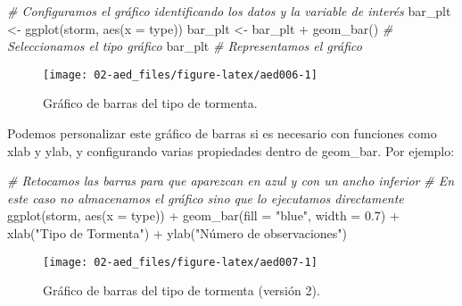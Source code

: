 \documentclass[
]{book}
\newenvironment{Shaded}{\begin{snugshade}}{\end{snugshade}}
\newcommand{\AttributeTok}[1]{\textcolor[rgb]{0.77,0.63,0.00}{#1}}
\newcommand{\CommentTok}[1]{\textcolor[rgb]{0.56,0.35,0.01}{\textit{#1}}}
\newcommand{\FloatTok}[1]{\textcolor[rgb]{0.00,0.00,0.81}{#1}}
\newcommand{\FunctionTok}[1]{\textcolor[rgb]{0.00,0.00,0.00}{#1}}
\newcommand{\NormalTok}[1]{#1}
\newcommand{\OtherTok}[1]{\textcolor[rgb]{0.56,0.35,0.01}{#1}}
\newcommand{\SpecialCharTok}[1]{\textcolor[rgb]{0.00,0.00,0.00}{#1}}
\newcommand{\StringTok}[1]{\textcolor[rgb]{0.31,0.60,0.02}{#1}}
\begin{document}
\begin{Shaded}
\begin{Highlighting}[]
\CommentTok{\# Configuramos el gráfico identificando los datos y la variable de interés}
\NormalTok{bar\_plt }\OtherTok{\textless{}{-}} \FunctionTok{ggplot}\NormalTok{(storm, }\FunctionTok{aes}\NormalTok{(}\AttributeTok{x =}\NormalTok{ type)) }
\NormalTok{bar\_plt }\OtherTok{\textless{}{-}}\NormalTok{ bar\_plt }\SpecialCharTok{+} \FunctionTok{geom\_bar}\NormalTok{() }\CommentTok{\# Seleccionamos el tipo gráfico}
\NormalTok{bar\_plt                         }\CommentTok{\# Representamos el gráfico}
\end{Highlighting}
\end{Shaded}

\begin{figure}

{\centering \texttt{[image: 02-aed\_files/figure-latex/aed006-1]} 

}

\caption{Gráfico de barras del tipo de tormenta.}\label{fig:aed006}
\end{figure}

Podemos personalizar este gráfico de barras si es necesario con funciones como xlab y ylab, y configurando varias propiedades dentro de geom\_bar. Por ejemplo:

\begin{Shaded}
\begin{Highlighting}[]
\CommentTok{\# Retocamos las barras para que aparezcan en azul y con un ancho inferior}
\CommentTok{\# En este caso no almacenamos el gráfico sino que lo ejecutamos directamente}
\FunctionTok{ggplot}\NormalTok{(storm, }\FunctionTok{aes}\NormalTok{(}\AttributeTok{x =}\NormalTok{ type)) }\SpecialCharTok{+} 
  \FunctionTok{geom\_bar}\NormalTok{(}\AttributeTok{fill =} \StringTok{"blue"}\NormalTok{, }\AttributeTok{width =} \FloatTok{0.7}\NormalTok{) }\SpecialCharTok{+} 
  \FunctionTok{xlab}\NormalTok{(}\StringTok{"Tipo de Tormenta"}\NormalTok{) }\SpecialCharTok{+} \FunctionTok{ylab}\NormalTok{(}\StringTok{"Número de observaciones"}\NormalTok{)}
\end{Highlighting}
\end{Shaded}

\begin{figure}

{\centering \texttt{[image: 02-aed\_files/figure-latex/aed007-1]} 

}

\caption{Gráfico de barras del tipo de tormenta (versión 2).}\label{fig:aed007}
\end{figure}
\end{document}
